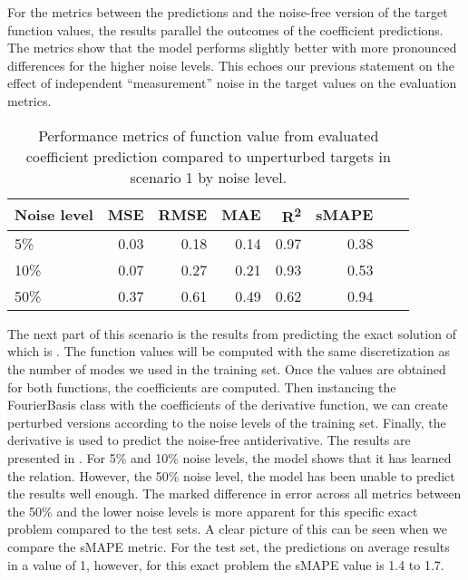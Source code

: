 For the metrics between the predictions and the noise-free version of the target function values, the results parallel the outcomes of the coefficient predictions. The metrics show that the model performs slightly better with more pronounced differences for the higher noise levels. This echoes our previous statement on the effect of independent \enquote{measurement} noise in the target values on the evaluation metrics.
\begin{table}[H]
  \caption{Performance metrics of function value from evaluated coefficient prediction compared to unperturbed targets in scenario 1 by noise level.}\label{table:scenario_1_clean_function_metrics}
  \centering
  \begin{tabular}{lrrrrrrr}
    \toprule
    Noise level & MSE  & RMSE & MAE  & R\textsuperscript{2}   & sMAPE \\
    \midrule
    5\%         & 0.03 & 0.18 & 0.14 & 0.97 & 0.38  \\
    10\%        & 0.07 & 0.27 & 0.21 & 0.93 & 0.53  \\
    50\%        & 0.37 & 0.61 & 0.49 & 0.62 & 0.94  \\
    \bottomrule
  \end{tabular}
\end{table}

The next part of this scenario is the results from predicting the exact solution of  which is . The function values will be computed with the same discretization as the number of modes we used in the training set. Once the values are obtained for both functions, the coefficients are computed. Then instancing the FourierBasis class with the coefficients of the derivative function, we can create perturbed versions according to the noise levels of the training set. Finally, the derivative is used to predict the noise-free antiderivative. The results are presented in . For 5\% and 10\% noise levels, the model shows that it has learned the relation. However, the 50\% noise level, the model has been unable to predict the results well enough. The marked difference in error across all metrics between the 50\% and the lower noise levels is more apparent for this specific exact problem compared to the test sets. A clear picture of this can be seen when we compare the sMAPE metric. For the test set, the predictions on average results in a value of 1, however, for this exact problem the sMAPE value is 1.4 to 1.7.

